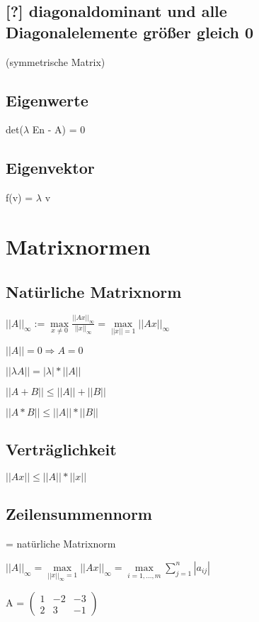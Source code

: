 \documentclass[12pt,a4paper]{article} %
\begin{document}
	\subsection{[?] diagonaldominant und alle Diagonalelemente größer gleich 0}
	(symmetrische Matrix)
	
	\subsection{Eigenwerte}
	det($\lambda$ En - A) = 0
	
	\subsection{Eigenvektor}
	f(v) = $\lambda$ v
		
	\newpage
	
	\section{Matrixnormen}
	
	\subsection{Natürliche Matrixnorm}
	
	$||A||_\infty := \max\limits_{x \ne 0} \frac{||Ax||_\infty}{||x||_\infty} = \max\limits_{||x|| = 1}||Ax||_\infty$
	
	$||A|| = 0 \Rightarrow A = 0 $
	
	$||\lambda A|| = |\lambda|*||A|| $
	
	$||A+B|| \le ||A|| + ||B||$
	
	$||A*B|| \le ||A|| * ||B||$

	
	\subsection{Verträglichkeit}
	$||Ax|| \le ||A|| * ||x||$
	
	\subsection{Zeilensummennorm}
	= natürliche Matrixnorm
	
	$||A||_\infty = \max\limits_{||x||_\infty = 1} ||Ax||_\infty = \max\limits_{i = 1, ..., m} \sum\limits_{j = 1}^{n} |a_{ij}|$
	
	A = 
	$\begin{pmatrix}
		1 & -2 & -3 \\
		2 & 3 & -1
	\end{pmatrix}$
	
\end{document}
